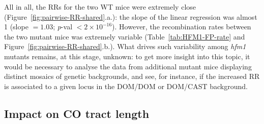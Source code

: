 All in all, the RRs for the two WT mice were extremely close (Figure~\ref{fig:pairwise-RR-shared}.a.): the slope of the linear regression was almost 1 (slope $=1.03$; \textit{p}-val $<2 \times 10^{-16}$).
However, the recombination rates between the two mutant mice was extremely variable (Table~\ref{tab:HFM1-FP-rate} and Figure~\ref{fig:pairwise-RR-shared}.b.).
What drives such variability among \textit{hfm1} mutants remains, at this stage, unknown: to get more insight into this topic, it would be necessary to analyse the data from additional mutant mice displaying distinct mosaics of genetic backgrounds, and see, for instance, if the increased RR is associated to a given locus in the DOM/DOM or DOM/CAST background.


\subsection{Impact on CO tract length}


